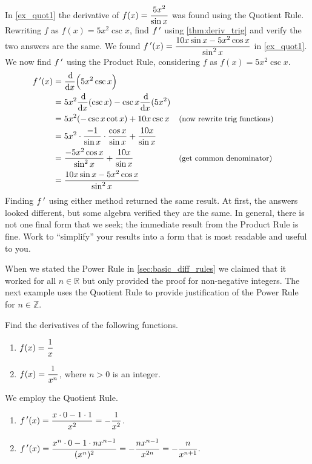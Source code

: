 \begin{example}\label{ex_prod_quot}%
In \autoref{ex_quot1} the derivative of $\displaystyle f(x) = \frac{5x^2}{\sin x}$ was found using the Quotient Rule. Rewriting $f$ as $f(x) = 5x^2\csc x$, find $f\,'$ using \autoref{thm:deriv_trig} and verify the two answers are the same.
\solution
We found $\displaystyle f\,'(x) = \frac{10x\sin x - 5x^2\cos x}{\sin^2 x}$ in \autoref{ex_quot1}. We now find $f\,'$ using the Product Rule, considering $f$ as $f(x) = 5x^2\csc x$.
\begin{align*}
	f\,'(x)
	&= \frac{\operatorname{d}\!}{\operatorname{d}\! x}\Bigl(5x^2\csc x\Bigr) \\
	& = 5x^2 \frac{\operatorname{d}\!}{\operatorname{d}\! x} (\csc x) - \csc x \frac{\operatorname{d}\!}{\operatorname{d}\! x}(5x^2) \\
	&= 5x^2(-\csc x\cot x) + 10x\csc x && \text{\small (now rewrite trig functions)}\\
	&= 5x^2\cdot \frac{-1}{\sin x}\cdot \frac{\cos x}{\sin x} + \frac{10x}{\sin x}\\
	&= \displaystyle\frac{-5x^2\cos x}{\sin ^2x}+\frac{10x}{\sin x} && \text{\small (get common denominator)}\\
	&= \frac{10x\sin x - 5x^2\cos x}{\sin^2x}
\end{align*}
Finding $f\,'$ using either method returned the same result. At first, the answers looked different, but some algebra verified they are the same. In general, there is not one final form that we seek; the immediate result from the Product Rule is fine. Work to ``simplify\primeskip'' your results into a form that is most readable and useful to you.
\end{example}

When we stated the Power Rule in \autoref{sec:basic_diff_rules} we claimed that it worked for all $n\in\mathbb{R}$ but only provided the proof for non-negative integers. The next example uses the Quotient Rule to provide justification of the Power Rule for  $n\in\mathbb{Z}$.

\begin{example}\label{ex_deriv_power}%
Find the derivatives of the following functions. 
\begin{enumerate}
	\item	$\displaystyle f(x) = \frac{1}{x}$
	\item	$\displaystyle f(x)= \frac{1}{x^n}$, where $n>0$ is an integer.
\end{enumerate}
\solution
We employ the Quotient Rule.
\begin{enumerate}
	\item	$\displaystyle f\,'(x) = \frac{x\cdot 0 - 1\cdot 1}{x^2} = -\frac{1}{x^2}$.
	\item	$\displaystyle f\,'(x) = \frac{x^n\cdot 0 - 1\cdot nx^{n-1}}{(x^n)^2} = -\frac{nx^{n-1}}{x^{2n}} = -\frac{n}{x^{n+1}}.$
\end{enumerate}
\end{example}

